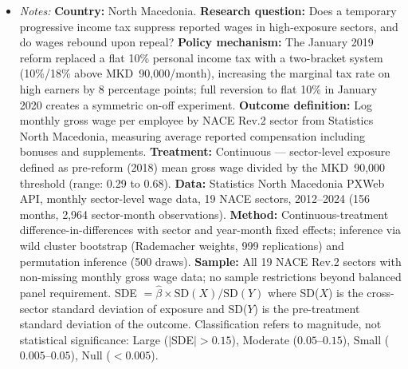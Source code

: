\begin{table}[htbp]
\begin{minipage}{\textwidth}
\begin{itemize}[leftmargin=*]
\item \textit{Notes:} \textbf{Country:} North Macedonia. \textbf{Research question:} Does a temporary progressive income tax suppress reported wages in high-exposure sectors, and do wages rebound upon repeal? \textbf{Policy mechanism:} The January 2019 reform replaced a flat 10\% personal income tax with a two-bracket system (10\%/18\% above MKD~90,000/month), increasing the marginal tax rate on high earners by 8 percentage points; full reversion to flat 10\% in January 2020 creates a symmetric on-off experiment. \textbf{Outcome definition:} Log monthly gross wage per employee by NACE Rev.2 sector from Statistics North Macedonia, measuring average reported compensation including bonuses and supplements. \textbf{Treatment:} Continuous --- sector-level exposure defined as pre-reform (2018) mean gross wage divided by the MKD~90,000 threshold (range: 0.29 to 0.68). \textbf{Data:} Statistics North Macedonia PXWeb API, monthly sector-level wage data, 19 NACE sectors, 2012--2024 (156 months, 2,964 sector-month observations). \textbf{Method:} Continuous-treatment difference-in-differences with sector and year-month fixed effects; inference via wild cluster bootstrap (Rademacher weights, 999 replications) and permutation inference (500 draws). \textbf{Sample:} All 19 NACE Rev.2 sectors with non-missing monthly gross wage data; no sample restrictions beyond balanced panel requirement. SDE $= \hat{\beta} \times \text{SD}(X) / \text{SD}(Y)$ where SD($X$) is the cross-sector standard deviation of exposure and SD($Y$) is the pre-treatment standard deviation of the outcome. Classification refers to magnitude, not statistical significance: Large ($|$SDE$| > 0.15$), Moderate ($0.05$--$0.15$), Small ($0.005$--$0.05$), Null ($< 0.005$).
\end{itemize}
\end{minipage}
\end{table}

